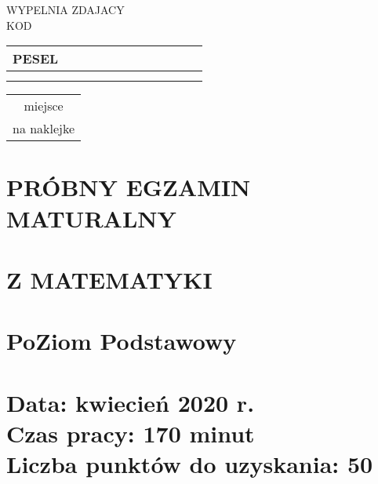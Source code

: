 \documentclass[10pt]{article}
\begin{document}
WYPELNIA ZDAJACY\\
KOD

\begin{center}
\begin{tabular}{|l|l|l|l|l|l|l|l|l|l|l|l|}
\hline
\multicolumn{1}{|c|}{PESEL} &  &  &  &  &  &  &  &  &  \\
\hline
 &  &  &  &  &  &  &  &  &  \\
\hline
 &  &  &  &  &  &  &  &  &  \\
\hline
\end{tabular}
\end{center}

\begin{center}
\begin{tabular}{c}
miejsce \\
na naklejke \\
\end{tabular}
\end{center}

\section*{PRÓBNY EGZAMIN MATURALNY}
\section*{Z MATEMATYKI}
\section*{PoZiom Podstawowy}
\section*{Data: kwiecień 2020 r. \\
 Czas pracy: 170 minut \\
 Liczba punktów do uzyskania: \(\mathbf{5 0}\)}
\end{document}
